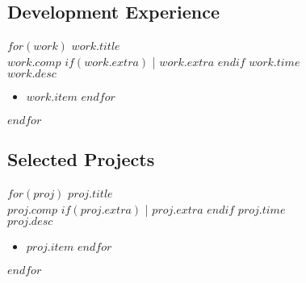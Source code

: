 \documentclass[$fontsize$, letter]{article}
\newcommand{\heading}[1]{
    \hrulefill \vspace{-0.5cm} \subsection*{{\color{gray} #1}}
}
\begin{document}
\begin{minipage}[t]{0.65\textwidth} %

\heading{Development Experience}
$for(work)$
    {\Large $work.title$}\\
    {\small \color{gray}
    $work.comp$
    $if(work.extra)$ \big| $work.extra$ $endif$ \hspace*{\fill} $work.time$}\\
    $work.desc$
    \vspace{-\topsep}
    \begin{itemize}
    $for(work.item)$
        \item $work.item$
    $endfor$
    \end{itemize}
$endfor$

\heading{Selected Projects}
$for(proj)$
    {\Large $proj.title$}\\
    {\small \color{gray}
    $proj.comp$
    $if(proj.extra)$ \big| $proj.extra$ $endif$ \hspace*{\fill} $proj.time$}\\
    $proj.desc$
    \vspace{-\topsep}
    \begin{itemize}
    $for(proj.item)$
        \item $proj.item$
    $endfor$
    \end{itemize}

$endfor$

\end{minipage}
    
\end{document}
